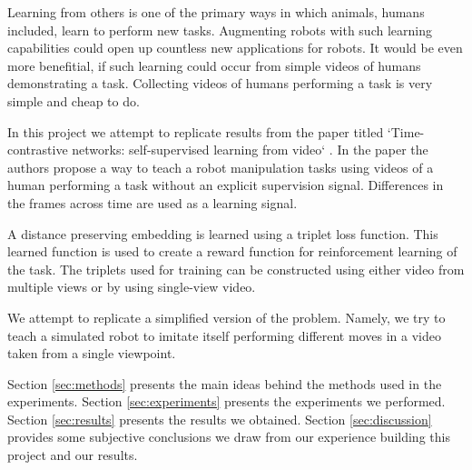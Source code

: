 
Learning from others is one of the primary ways in which animals, humans included, learn to perform new tasks. Augmenting robots with such learning capabilities could open up countless new applications for robots. It would be even more benefitial, if such learning could occur from simple videos of humans demonstrating a task. Collecting videos of humans performing a task is very simple and cheap to do.

In this project we attempt to replicate results from the paper titled `Time-contrastive networks: self-supervised learning from video` \cite{self-supervised-learning}. In the paper the authors propose a way to teach a robot manipulation tasks using videos of a human performing a task without an explicit supervision signal. Differences in the frames across time are used as a learning signal.

A distance preserving embedding is learned using a triplet loss function. This learned function is used to create a reward function for reinforcement learning of the task. The triplets used for training can be constructed using either video from multiple views or by using single-view video.

We attempt to replicate a simplified version of the problem. Namely, we try to teach a simulated robot to imitate itself performing different moves in a video taken from a single viewpoint.

Section \ref{sec:methods} presents the main ideas behind the methods used in the experiments. Section \ref{sec:experiments} presents the experiments we performed. Section \ref{sec:results} presents the results we obtained. Section \ref{sec:discussion} provides some subjective conclusions we draw from our experience building this project and our results.



